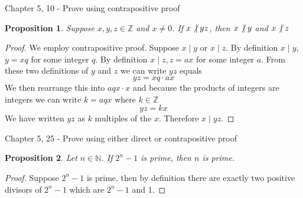 \documentclass[12pt,letterpaper, onecolumn]{exam}
\newtheorem*{prop}{Proposition}
\newcommand{\doesnotdivide}{\not\hspace{2.5pt}\mid}
\begin{document}
\noindent Chapter 5, 10 - Prove using contrapositive proof
\begin{prop}
	
Suppose $x,y,z \in \mathbb{Z}$ and $x\neq0$. If $x\doesnotdivide yz$, then $x\doesnotdivide y$ and $x\doesnotdivide z$
	
\end{prop}

\begin{proof}
	
We employ contrapositive proof. Suppose $x\mid y$ or $x\mid z$. By definition  $x\mid y$, $y=xq$ for some integer $q$. By definition  $x\mid z, z=ax$ for some integer $a$. From these two definitions of $y$ and $z$ we can write $yz$ equals
$$yz=xq\cdot ax$$
We then rearrange this into $aqx\cdot x$ and because the products of integers are integers we can write $k=aqx$ where $k\in\mathbb{Z}$
$$yz=kx$$
We have written $yz$ as $k$ multiples of the $x$. Therefore $x\mid yz.$
\end{proof}

\noindent Chapter 5, 25 - Prove using either direct or contrapositive proof
\begin{prop}
	
Let $n\in\mathbb{N}$. If $2^n-1$ is prime, then $n$ is prime.
	
\end{prop}

\begin{proof}
	Suppose $2^n-1$ is prime, then by definition there are exactly two positive divisors of $2^n-1$ which are $2^n-1$ and 1. 
\end{proof}
\end{document}
